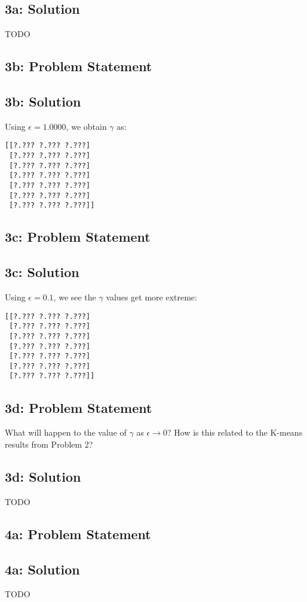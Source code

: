 \documentclass[10pt]{article}
\newcommand{\officialdirections}[1]{{\color{blue} #1}}
\begin{document}
\subsection{3a: Solution}

TODO



\newpage
\officialdirections{
\subsection*{3b: Problem Statement}
}

\subsection{3b: Solution}

Using $\epsilon = 1.0000$, we obtain $\gamma$ as:
\begin{verbatim}
[[?.??? ?.??? ?.???]
 [?.??? ?.??? ?.???]
 [?.??? ?.??? ?.???]
 [?.??? ?.??? ?.???]
 [?.??? ?.??? ?.???]
 [?.??? ?.??? ?.???]
 [?.??? ?.??? ?.???]]
\end{verbatim}

\officialdirections{
\subsection*{3c: Problem Statement}
}

\subsection{3c: Solution}

Using $\epsilon = 0.1$, we see the $\gamma$ values get more extreme:
\begin{verbatim}
[[?.??? ?.??? ?.???]
 [?.??? ?.??? ?.???]
 [?.??? ?.??? ?.???]
 [?.??? ?.??? ?.???]
 [?.??? ?.??? ?.???]
 [?.??? ?.??? ?.???]
 [?.??? ?.??? ?.???]]
\end{verbatim}

\newpage
\officialdirections{
\subsection*{3d: Problem Statement}
What will happen to the value of $\gamma$ as $\epsilon \rightarrow 0$? How is this related to the K-means results from Problem 2?
}

\subsection{3d: Solution}

TODO

\newpage
\officialdirections{
\subsection*{4a: Problem Statement}
}

\subsection{4a: Solution}

TODO
\end{document}
